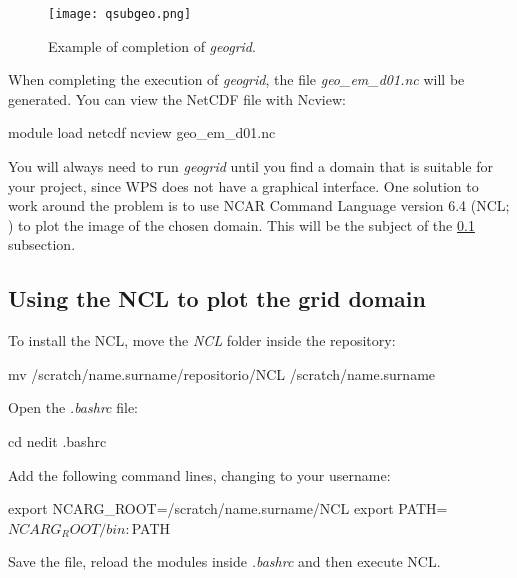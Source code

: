 \bigskip

\begin{figure}[H]
    \centering
    \texttt{[image: qsubgeo.png]}
    \caption{Example of completion of \textit{geogrid}.}
    \label{qsubgeofinal}
\end{figure}
\bigskip

\noindent When completing the execution of \textit{geogrid}, the file \textit{geo\_em\_d01.nc} will be generated.
 You can view the NetCDF file with Ncview:
\bigskip

\begin{bashcode}
module load netcdf
ncview geo_em_d01.nc
\end{bashcode}
\bigskip

\noindent You will always need to run \textit{geogrid} until you find a domain that is suitable for your project, 
since WPS does not have a graphical interface. One solution to work around the problem is to use NCAR Command Language version 6.4 
(NCL; \cite{Ncl2017}) to plot the image of the chosen domain. This will be the subject of the \textcolor{bleu_cite}{\ref{nclsec}} subsection.

\bigskip

\subsection{Using the NCL to plot the grid domain}\label{nclsec}
\bigskip

\noindent To install the NCL, move the \textit{NCL} folder inside the repository:
\bigskip

\begin{bashcode}
mv /scratch/name.surname/repositorio/NCL /scratch/name.surname
\end{bashcode}
\bigskip

\noindent Open the \textit{.bashrc} file:
\bigskip

\begin{bashcode}
cd
nedit .bashrc
\end{bashcode}
\bigskip

\noindent Add the following command lines, changing to your username:
\bigskip

\begin{bashcode}
export NCARG_ROOT=/scratch/name.surname/NCL
export PATH=$NCARG_ROOT/bin:$PATH
\end{bashcode}
\bigskip

\noindent Save the file, reload the modules inside \textit{.bashrc} and then execute NCL.
\bigskip


